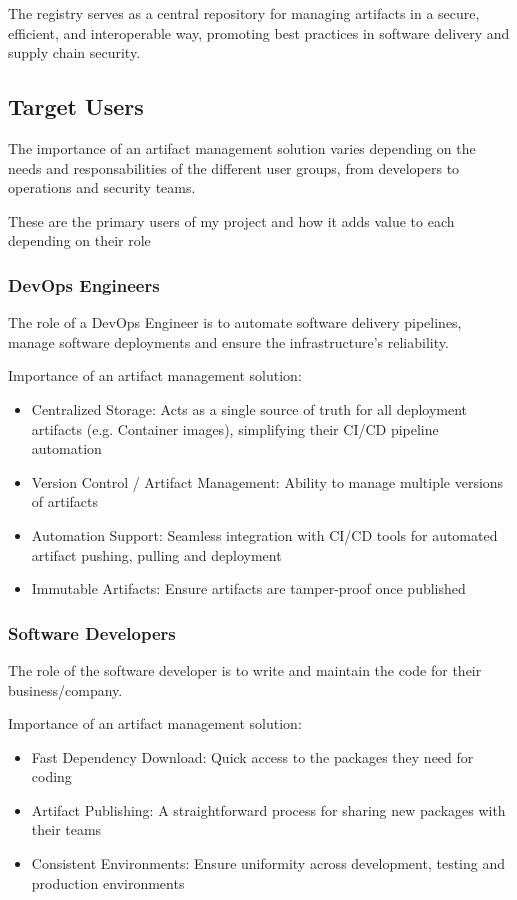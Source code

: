 \documentclass{article}
\begin{document}
  The registry serves as a central repository for managing artifacts in a secure, efficient, and interoperable way, promoting best practices in software delivery and supply chain security.

  \subsection{Target Users}

  The importance of an artifact management solution varies depending on the needs and responsabilities of the different user groups, from developers to operations and security teams. 

  These are the primary users of my project and how it adds value to each depending on their role

  \subsubsection{DevOps Engineers}

  The role of a DevOps Engineer is to automate software delivery pipelines, manage software deployments and ensure the infrastructure's reliability.

  Importance of an artifact management solution:
  \begin{itemize}
    \item Centralized Storage: Acts as a single source of truth for all deployment artifacts (e.g. Container images), simplifying their CI/CD pipeline automation
    \item Version Control / Artifact Management: Ability to manage multiple versions of artifacts
    \item Automation Support: Seamless integration with CI/CD tools for automated artifact pushing, pulling and deployment
    \item Immutable Artifacts: Ensure artifacts are tamper-proof once published
  \end{itemize}

  \subsubsection{Software Developers}

  The role of the software developer is to write and maintain the code for their business/company.

  Importance of an artifact management solution:
  \begin{itemize}
    \item Fast Dependency Download: Quick access to the packages they need for coding
    \item Artifact Publishing: A straightforward process for sharing new packages with their teams
    \item Consistent Environments: Ensure uniformity across development, testing and production environments
  \end{itemize}
\end{document}
